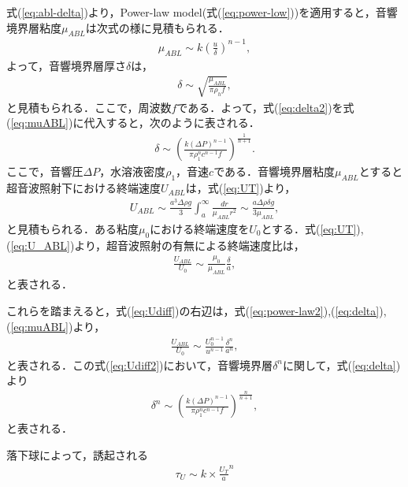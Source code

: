 式(\ref{eq:abl-delta})より，Power-law model(式(\ref{eq:power-low}))を適用すると，音響境界層粘度$\mu_{ABL}$は次式の様に見積もられる．
\begin{eqnarray}
    \mu_{ABL} \sim k\left(\frac{u}{\delta}\right)^{n-1} ,
    \label{eq:muABL}
\end{eqnarray}
よって，音響境界層厚さ$\delta$は，
\begin{eqnarray}
    \delta \sim \sqrt{\frac{\mu_{ABL}}{\pi \rho_h f}} ,
    \label{eq:delta2}
\end{eqnarray}
と見積もられる\cite{deshpande2001vibrational,wiklund2012acoustofluidics}．ここで，周波数$f$である．よって，式(\ref{eq:delta2})を式(\ref{eq:muABL})に代入すると，次のように表される．
\begin{eqnarray}
    \delta \sim \left(\frac{k\left(\Delta P\right)^{n-1}}{\pi \rho^n_1 c^{n-1} f}\right)^{\frac{1}{n+1}} .
    \label{eq:delta}
\end{eqnarray}
ここで，音響圧$\Delta P$，水溶液密度$\rho_1$，音速$c$である．音響境界層粘度$\mu_{ABL}$とすると超音波照射下における終端速度$U_{ABL}$は，式(\ref{eq:UT})より，
\begin{eqnarray}
    U_{ABL} \sim \frac{a^3\Delta\rho g}{3}  \int^{\infty}_{a} \frac{dr}{\mu_{ABL} r^2} \sim \frac{a\Delta \rho \delta g}{3\mu_{ABL}} ,
    \label{eq:U_ABL}
\end{eqnarray}
と見積もられる．ある粘度$\mu_0$における終端速度を$U_0$とする．式(\ref{eq:UT}),(\ref{eq:U_ABL})より，超音波照射の有無による終端速度比は，
\begin{eqnarray}
    \frac{U_{ABL}}{U_0} \sim \frac{\mu_0}{\mu_{ABL}}\frac{\delta}{a} ,
    \label{eq:Udiff}
\end{eqnarray}
と表される．

これらを踏まえると，式(\ref{eq:Udiff})の右辺は，式(\ref{eq:power-law2}),(\ref{eq:delta}),(\ref{eq:muABL})より，
\begin{eqnarray}
    \frac{U_{ABL}}{U_0} \sim \frac{U_0^{n-1}}{u^{n-1}}\frac{\delta^n}{a^n} ,
    \label{eq:Udiff2}
\end{eqnarray}
と表される．この式(\ref{eq:Udiff2})において，音響境界層$\delta^n$に関して，式(\ref{eq:delta})より
\begin{eqnarray}
    \delta^n \sim \left(\frac{k\left(\Delta P\right)^{n-1}}{\pi \rho^n_1 c^{n-1} f}\right)^{\frac{n}{n+1}} ,
    \label{eq:ndelta}
\end{eqnarray}
と表される．


落下球によって，誘起される
\begin{eqnarray}
    \tau_U \sim k \times \frac{U_T}{a}^{n}
    \label{eq:tauU}
\end{eqnarray}
